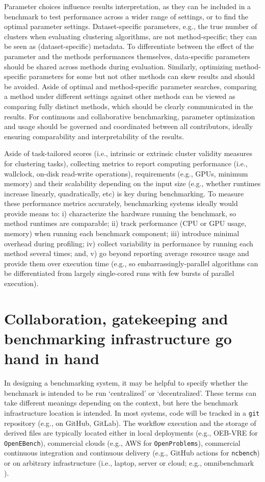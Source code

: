 \documentclass[11pt]{article}
\begin{document}
Parameter choices influence results interpretation, as they can be included in a benchmark to test performance across a wider range of settings, or to find the optimal parameter settings. 
Dataset-specific parameters, e.g., the true number of clusters when evaluating clustering algorithms, are not method-specific; they can be seen as (dataset-specific) metadata. To differentiate between the effect of the parameter and the methods performances themselves, data-specific parameters should be shared across methods during evaluation.
Similarly, optimizing method-specific parameters for some but not other methods can skew results and should be avoided. 
Aside of optimal and method-specific parameter searches, comparing a method under different settings against other methods can be viewed as comparing fully distinct methods, which should be clearly communicated in the results. 
For continuous and collaborative benchmarking, parameter optimization and usage should be governed and coordinated between all contributors, ideally ensuring comparability and interpretability of the results. 

{\color{red}
Aside of task-tailored scores (i.e., intrinsic or extrinsic cluster validity measures for clustering tasks), collecting metrics to report computing performance (i.e., wallclock, on-disk read-write operations), requirements (e.g., GPUs, minimum memory) and their scalability depending on the input size (e.g., whether runtimes increase linearly, quadratically, etc) is key during benchmarking. To measure these performance metrics accurately, benchmarking systems ideally would provide means to: i) characterize the hardware running the benchmark, so method runtimes are comparable;  ii) track performance (CPU or GPU usage, memory) when running each benchmark component; iii) introduce minimal overhead during profiling; iv) collect variability in performance by running each method several times; and, v) go beyond reporting average resource usage and provide them over execution time (e.g., so embarrassingly-parallel algorithms can be differentiated from largely single-cored runs with few bursts of parallel execution).
}

\section*{Collaboration, gatekeeping and benchmarking infrastructure go hand in hand}

In designing a benchmarking system, it may be helpful to specify whether the benchmark is intended to be run `centralized' or `decentralized'. These terms can take different meanings depending on the context, but here the benchmark infrastructure location is intended. In most systems, code will be tracked in a \texttt{git} repository (e.g., on GitHub, GitLab). The workflow execution and the storage of derived files are typically located either in local deployments (e.g., OEB-VRE for \texttt{OpenEBench}), commercial clouds (e.g., AWS for \texttt{OpenProblems}), commercial continuous integration and continuous delivery (e.g., GitHub actions for \texttt{ncbench}) or on arbitrary infrastructure (i.e., laptop, server or cloud; e.g., omnibenchmark \cite{omnibenchmark}). 
\end{document}

